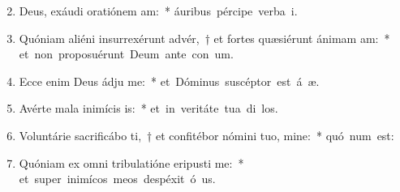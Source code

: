 \begin{flushleft}
\begin{enumerate}[leftmargin=*]
\setcounter{enumi}{1}

\item Deus, exáudi oratiónem am:~* \mbox{áuribus pércipe verba  i.}
\item Quóniam aliéni insurrexérunt advér,~† et fortes quæsiérunt ánimam am:~* \mbox{et non proposuérunt Deum ante con um.}
\item Ecce enim Deus ádju me:~* \mbox{et Dóminus suscéptor est á æ.}
\item Avérte mala inimícis is:~* \mbox{et in veritáte tua di los.}
\item Voluntárie sacrificábo ti,~† et confitébor nómini tuo, mine:~* \mbox{quó num est:}
\item Quóniam ex omni tribulatióne eripusti me:~* \mbox{et super inimícos meos despéxit ó us.}

\end{enumerate}
\end{flushleft}

